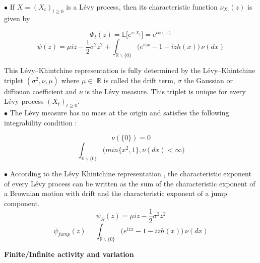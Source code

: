 \documentclass[12pt]{report}
\begin{document}
$\bullet$ If  $X = (X_t)_{t\geq 0}$  is a Lévy process, then its characteristic function  $\nu_{X_t}(z)$   is given by

\begin{equation}
\Phi_t(z)=\mathbb{E}\Big[e^{iz X_t} \Big] =e^ {t \psi (z)}
\end{equation}
\begin{equation}
\psi (z)= \mu iz - \frac{1}{2}\sigma^2  z^2 + 
\int_{\mathbb{R}\backslash\{0\}} \big( e^{izx}-1 -iz h(x)\big)\,\nu(dx) 
\end{equation}

This Lévy–Khintchine representation is fully determined by the Lévy–Khintchine triplet $(\sigma^2,\nu, \mu)$ where $\mu \in $ $\mathbb{R}$ is called the drift term, $\sigma$ the Gaussian or diffusion
coefficient and $\nu$ is the Lévy measure. This triplet is unique for every Lévy process $(X_t)_{t\geq 0}$.\\
$\bullet$ The Lévy measure has no mass at the origin and satisfies the following integrability condition :
\begin{multicols}{2}\noindent
\begin{equation}
 \nu( \{0 \}) = 0
\end{equation}
\begin{equation}
\int_{\mathbb{R}\backslash\{0\}} \big( min \{x^2,1\} ,\nu(dx) < \infty  \Big)
\end{equation}
\end{multicols}

$\bullet$ According to the Lévy Khintchine representation
, the characteristic exponent of every Lévy process can be written as the sum of the characteristic exponent of a Brownian motion with drift and the characteristic exponent of a jump component.
$$\psi_B (z)= \mu iz - \frac{1}{2}\sigma^2  z^2 $$
$$\psi_{jump}(z)=\int_{\mathbb{R}\backslash\{0\}} \big( e^{izx}-1 -iz h(x)\big)\,\nu(dx)$$

\textbf{Finite/Infinite activity and variation }\\
\end{document}
